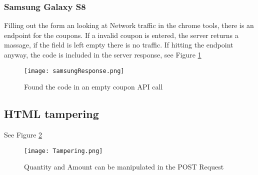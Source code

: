 \documentclass[
	letterpaper, %
	10pt, %
	unnumberedsections, %
	twoside, %
]{APAAssignment}
\begin{document}
\begin{appendices}
\subsubsection{Samsung Galaxy S8}
Filling out the form an looking at Network traffic in the chrome tools, there is an endpoint for the coupons. If a invalid coupon is entered, the server returns a massage, if the field is left empty there is no traffic. If hitting the endpoint anyway, the code is included in the server response,
see Figure \ref{fig:app:samsungResponse}


\begin{figure}[!htp] %
	\centering
	\texttt{[image: samsungResponse.png]}
	\caption{Found the code in an empty coupon API call}
	\label{fig:app:samsungResponse}
\end{figure}


\subsection{HTML tampering}
See Figure \ref{fig:app:Tampering}
\begin{figure}[!htp] %
	\centering
	\texttt{[image: Tampering.png]}
	\caption{Quantity and Amount can be manipulated in the POST Request}
	\label{fig:app:Tampering}
\end{figure}




\end{appendices}
\end{document}
